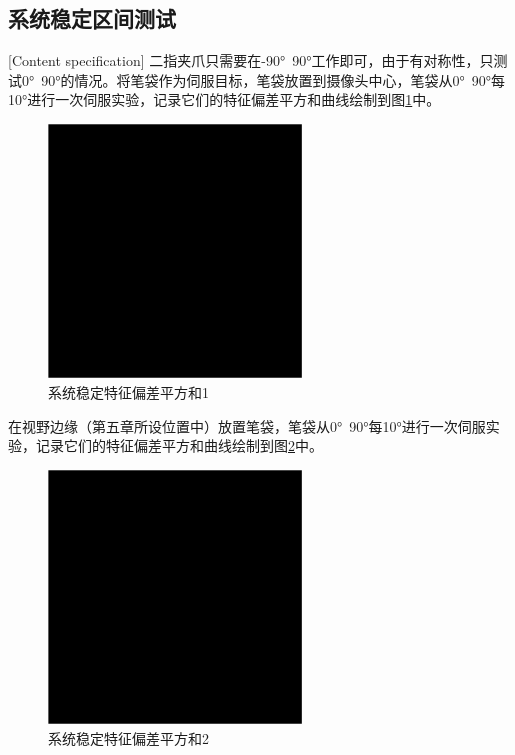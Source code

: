 \documentclass[fontset=fandol,type=bachelor,campus=harbin,bsmainpagenumberline=true]{hithesisbook}
\begin{document}
\subsection{系统稳定区间测试}[Content specification]
二指夹爪只需要在-90°~90°工作即可，由于有对称性，只测试0°~90°的情况。将笔袋作为伺服目标，笔袋放置到摄像头中心，笔袋从0°~90°每10°进行一次伺服实验，记录它们的特征偏差平方和曲线绘制到图\ref{系统稳定特征偏差平方和1}中。
\begin{figure}[h]
	\centering
	\includegraphics[width=0.6\textwidth]{chapter6/替身}
	\caption{系统稳定特征偏差平方和1}
	\label{系统稳定特征偏差平方和1}
\end{figure}


在视野边缘（第五章所设位置中）放置笔袋，笔袋从0°~90°每10°进行一次伺服实验，记录它们的特征偏差平方和曲线绘制到图\ref{系统稳定特征偏差平方和2}中。
\begin{figure}[h]
	\centering
	\includegraphics[width=0.6\textwidth]{chapter6/替身}
	\caption{系统稳定特征偏差平方和2}
	\label{系统稳定特征偏差平方和2}
\end{figure}
\end{document}
